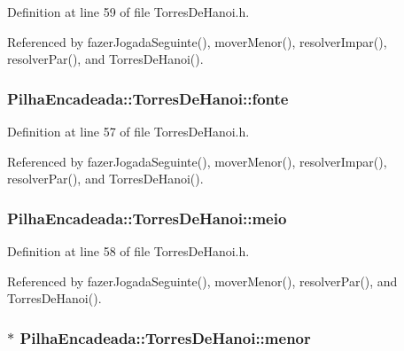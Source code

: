 Definition at line 59 of file TorresDeHanoi.h.



Referenced by fazerJogadaSeguinte(), moverMenor(), resolverImpar(), resolverPar(), and TorresDeHanoi().

\hypertarget{classPilhaEncadeada_1_1TorresDeHanoi_a18f731e4da165a4550bf33e9607f29b3}{
\subsubsection[{fonte}]{ {\bf PilhaEncadeada::TorresDeHanoi::fonte}}}
\label{classPilhaEncadeada_1_1TorresDeHanoi_a18f731e4da165a4550bf33e9607f29b3}


Definition at line 57 of file TorresDeHanoi.h.



Referenced by fazerJogadaSeguinte(), moverMenor(), resolverImpar(), resolverPar(), and TorresDeHanoi().

\hypertarget{classPilhaEncadeada_1_1TorresDeHanoi_aa22379df705956747d5036c4e6a6c209}{
\subsubsection[{meio}]{ {\bf PilhaEncadeada::TorresDeHanoi::meio}}}
\label{classPilhaEncadeada_1_1TorresDeHanoi_aa22379df705956747d5036c4e6a6c209}


Definition at line 58 of file TorresDeHanoi.h.



Referenced by fazerJogadaSeguinte(), moverMenor(), resolverPar(), and TorresDeHanoi().

\hypertarget{classPilhaEncadeada_1_1TorresDeHanoi_a119881c601dca2a34731b05254355b96}{
\subsubsection[{menor}]{$\ast$ {\bf PilhaEncadeada::TorresDeHanoi::menor}}}
\label{classPilhaEncadeada_1_1TorresDeHanoi_a119881c601dca2a34731b05254355b96}


